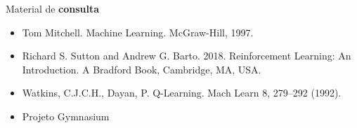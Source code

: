 \documentclass{beamer}
\begin{document}
%	
%	
%	
%
%
%
%
%
%
%
%

\begin{frame}{Material de \textbf{consulta}}
\begin{itemize}
  \item Tom Mitchell. Machine Learning. McGraw-Hill, 1997.
  \item Richard S. Sutton and Andrew G. Barto. 2018. Reinforcement Learning: An Introduction. A Bradford Book, Cambridge, MA, USA.
  \item Watkins, C.J.C.H., Dayan, P. Q-Learning. Mach Learn 8, 279–292 (1992). \href{https://doi.org/10.1007/BF00992698}{}
  \item Projeto Gymnasium \href{https://gymnasium.farama.org/}{}
\end{itemize}
\end{frame}
\end{document}
